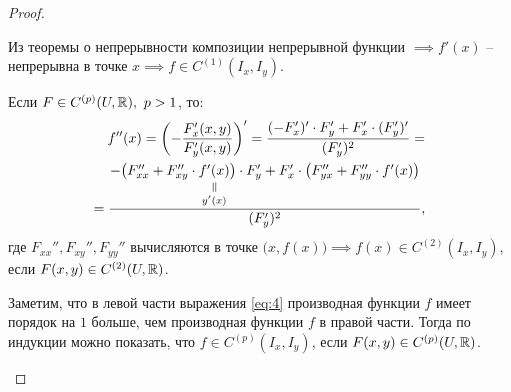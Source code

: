 \begin{proof}
\begin{enumerate}
              Из теоремы о непрерывности композиции непрерывной функции $\implies f'(x)$ -- непрерывна в точке $x \implies f \in C^{(1)}(I_x,I_y)$.

              Если $F \in C^{(p)}(U,\mathbb{R}), \ p > 1$, то:
              \begin{multline}\label{eq:4}
                  \quad f''(x) = \left(-\frac{F_x'(x,y)}{F_y'(x,y)}\right)' = \frac{(-F_x')' \cdot F_y' + F_x' \cdot (F_y')'}{(F_y')^2} = \\
                  = \frac{-\big(F_{xx}'' + F_{xy}'' \cdot \equalto{f'(x)}{y'(x)}\big)\cdot F_y' + F_x'\cdot \big(F_{yx}'' + F_{yy}'' \cdot f'(x)\big)}{(F_y')^2},
              \end{multline}
              где $F_{xx}'', F_{xy}'', F_{yy}''$ вычисляются в точке $\big(x,f(x)\big)\implies f(x) \in C^{(2)}(I_x,I_y)$, если $F(x,y) \in C^{(2)}(U,\mathbb{R})$.

              Заметим, что в левой части выражения \ref{eq:4} производная функции $f$ имеет порядок на $1$ больше, чем производная функции $f$ в правой части. Тогда по индукции можно показать, что $f \in C^{(p)}(I_x,I_y)$, если $F(x,y) \in C^{(p)}(U,\mathbb{R})$.
    \end{enumerate}
\end{proof}